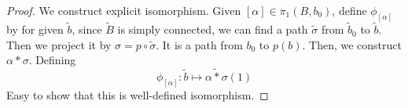 \documentclass[12pt, a4paper, twoside]{article}
\theoremstyle{plain}
\begin{document}
\begin{proof}
    We construct explicit isomorphism. 
    Given $[\alpha] \in \pi_1(B, b_0)$, define $\phi_{[\alpha]}$ by 
    for given $\tilde{b}$, since $\tilde{B}$ is simply connected, 
    we can find a path $\tilde{\sigma}$ from $\tilde{b}_0$ to $\tilde{b}$. 
    Then we project it by $\sigma = p \circ \tilde{\sigma}$. 
    It is a path from $b_0$ to $p(b)$. 
    Then, we construct $\alpha * \sigma$. 
    Defining 
    \[\phi_{[\alpha]}: \tilde{b} \mapsto \widetilde{\alpha * \sigma}(1)\]
    Easy to show that this is well-defined isomorphism. 
\end{proof}

\newpage 


 
\end{document}
